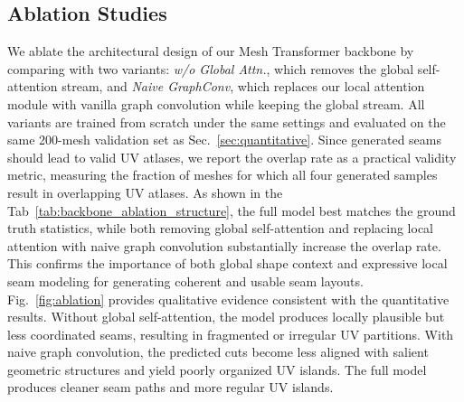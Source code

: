 \subsection{Ablation Studies}
\label{sec:ablation}
We ablate the architectural design of our Mesh Transformer backbone by comparing \methodname{} with two variants: \emph{w/o Global Attn.}, which removes the global self-attention stream, and \emph{Naive GraphConv}, which replaces our local attention module with vanilla graph convolution while keeping the global stream. 
All variants are trained from scratch under the same settings and evaluated on the same 200-mesh validation set as Sec.~\ref{sec:quantitative}.
Since generated seams should lead to valid UV atlases, we report the overlap rate as a practical validity metric, measuring the fraction of meshes for which all four generated samples result in overlapping UV atlases.
As shown in the Tab~\ref{tab:backbone_ablation_structure}, the full model best matches the ground truth statistics, while both removing global self-attention and replacing local attention with naive graph convolution substantially increase the overlap rate. 
This confirms the importance of both global shape context and expressive local seam modeling for generating coherent and usable seam layouts.
Fig.~\ref{fig:ablation} provides qualitative evidence consistent with the quantitative results.
Without global self-attention, the model produces locally plausible but less coordinated seams, resulting in fragmented or irregular UV partitions.
With naive graph convolution, the predicted cuts become less aligned with salient geometric structures and yield poorly organized UV islands.
The full model produces cleaner seam paths and more regular UV islands.

